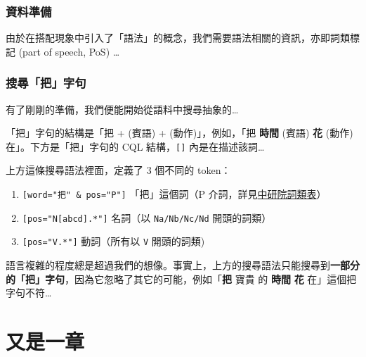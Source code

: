 \hypertarget{ux8cc7ux6599ux6e96ux5099}{%
\subsection{資料準備}\label{ux8cc7ux6599ux6e96ux5099}}

由於在搭配現象中引入了「語法」的概念，我們需要語法相關的資訊，亦即詞類標記
(part of speech, PoS) \ldots{}

\begin{Shaded}
\begin{Highlighting}[]
\end{Highlighting}
\end{Shaded}

\hypertarget{ux641cux5c0bux628aux5b57ux53e5}{%
\subsection{搜尋「把」字句}\label{ux641cux5c0bux628aux5b57ux53e5}}

有了剛剛的準備，我們便能開始從語料中搜尋抽象的\ldots{}

「把」字句的結構是「把 + (賓語) + (動作)」，例如，「把 \textbf{時間}
(賓語) \textbf{花} (動作) 在」。下方是「把」字句的 CQL
結構，\texttt{{[}{]}} 內是在描述該詞\ldots{}

上方這條搜尋語法裡面，定義了 3 個不同的 token：

\begin{enumerate}
\def\labelenumi{\arabic{enumi}.}
\tightlist
\item
  \texttt{{[}word="把"\ \&\ pos="P"{]}} 「把」這個詞（P
  介詞，詳見\href{https://github.com/ckiplab/ckiptagger/wiki/POS-Tags}{中研院詞類表}）
\item
  \texttt{{[}pos="N{[}abcd{]}.*"{]}} 名詞（以 \texttt{Na/Nb/Nc/Nd}
  開頭的詞類）
\item
  \texttt{{[}pos="V.*"{]}} 動詞（所有以 \texttt{V} 開頭的詞類)
\end{enumerate}

語言複雜的程度總是超過我們的想像。事實上，上方的搜尋語法只能搜尋到\textbf{一部分的「把」字句}，因為它忽略了其它的可能，例如「\textbf{把}
寶貴 的 \textbf{時間} \textbf{花} 在」這個把字句不符\ldots{}

\hypertarget{ux53c8ux662fux4e00ux7ae0}{%
\chapter{又是一章}\label{ux53c8ux662fux4e00ux7ae0}}

